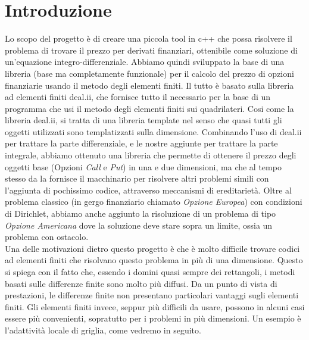 \documentclass[a4paper,10pt]{report}
\theoremstyle{plain}
\theoremstyle{definition}
\theoremstyle{remark}
\begin{document}
	\clearpage
	\thispagestyle{empty}
	
	\clearpage

\clearpage
\thispagestyle{plain}
\par\vspace*{.35\textheight}{\raggedleft An approximate answer to the right problem is worth a good deal more than an exact answer to an approximate problem.\par}
\par\vspace{1cm}{\raggedleft John Tukey\par}

\tableofcontents
\listoftodos

\chapter*{Introduzione}

Lo scopo del progetto è di creare una piccola tool in \textsf{c++} che possa risolvere il problema di trovare il prezzo per derivati finanziari, ottenibile come soluzione di un'equazione integro-differenziale. Abbiamo quindi sviluppato la base di una libreria (base ma completamente funzionale) per il calcolo del prezzo di opzioni finanziarie usando il metodo degli elementi finiti. Il tutto è basato sulla libreria ad elementi finiti \textsf{deal.ii}, che fornisce tutto il necessario per la base di un programma che usi il metodo degli elementi finiti sui quadrilateri. Cosi come la libreria \textsf{deal.ii}, si tratta di una libreria template nel senso che quasi tutti gli oggetti utilizzati sono templatizzati sulla dimensione. Combinando l'uso di \textsf{deal.ii} per trattare la parte differenziale, e le nostre aggiunte per trattare la parte integrale, abbiamo ottenuto una libreria che permette di ottenere il prezzo degli oggetti base (Opzioni \emph{Call} e \emph{Put}) in una e due dimensioni, ma che al tempo stesso da la fornisce il macchinario per risolvere altri problemi simili con l'aggiunta di pochissimo codice, attraverso meccanismi di ereditarietà. Oltre al problema classico (in gergo finanziario chiamato \emph{Opzione Europea}) con condizioni di Dirichlet, abbiamo anche aggiunto la risoluzione di un problema di tipo \emph{Opzione Americana} dove la soluzione deve stare sopra un limite, ossia un problema con ostacolo.\\ 

Una delle motivazioni dietro questo progetto è che è molto difficile trovare codici ad elementi finiti che risolvano questo problema in più di una dimensione. Questo si spiega con il fatto che, essendo i domini quasi sempre dei rettangoli, i metodi basati sulle differenze finite sono molto più diffusi. Da un punto di vista di prestazioni, le differenze finite non presentano particolari vantaggi sugli elementi finiti. Gli elementi finiti invece, seppur più difficili da usare, possono in alcuni casi essere più convenienti, sopratutto per i problemi in più dimensioni. Un esempio è l'adattività locale di griglia, come vedremo in seguito.
\end{document}
